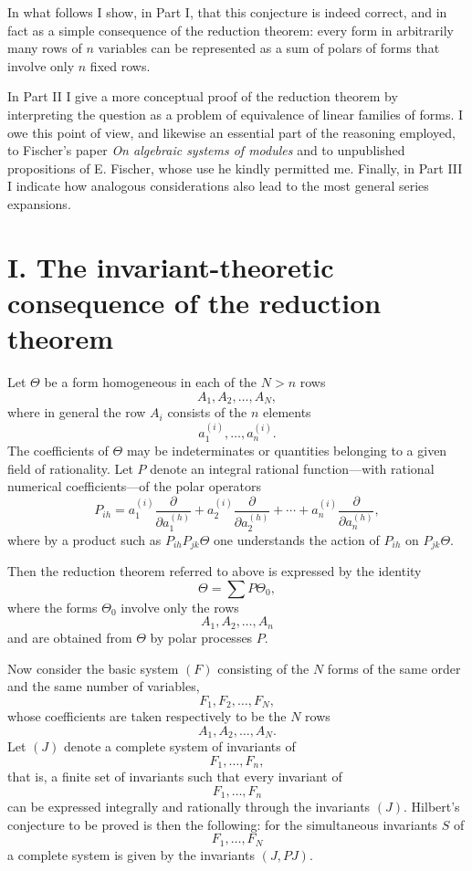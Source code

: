 \documentclass[11pt]{article}
\begin{document}
In what follows I show, in Part I, that this conjecture is indeed correct, and in fact as a simple consequence of the reduction theorem: every form in arbitrarily many rows of \(n\) variables can be represented as a sum of polars of forms that involve only \(n\) fixed rows.

In Part II I give a more conceptual proof of the reduction theorem by interpreting the question as a problem of equivalence of linear families of forms. I owe this point of view, and likewise an essential part of the reasoning employed, to Fischer's paper \emph{On algebraic systems of modules} and to unpublished propositions of E. Fischer, whose use he kindly permitted me. Finally, in Part III I indicate how analogous considerations also lead to the most general series expansions.

\section*{I. The invariant-theoretic consequence of the reduction theorem}

Let \(\Theta\) be a form homogeneous in each of the \(N>n\) rows
\[
A_1,A_2,\dots,A_N,
\]
where in general the row \(A_i\) consists of the \(n\) elements
\[
a_1^{(i)},\dots,a_n^{(i)}.
\]
The coefficients of \(\Theta\) may be indeterminates or quantities belonging to a given field of rationality. Let \(P\) denote an integral rational function---with rational numerical coefficients---of the polar operators
\[
P_{ih}
=
a_1^{(i)}\frac{\partial}{\partial a_1^{(h)}}
+
a_2^{(i)}\frac{\partial}{\partial a_2^{(h)}}
+\cdots+
a_n^{(i)}\frac{\partial}{\partial a_n^{(h)}},
\]
where by a product such as \(P_{ih}P_{jk}\Theta\) one understands the action of \(P_{ih}\) on \(P_{jk}\Theta\).

Then the reduction theorem referred to above is expressed by the identity
\[
\Theta = \sum P\Theta_0,
\tag{1}
\]
where the forms \(\Theta_0\) involve only the rows
\[
A_1,A_2,\dots,A_n
\]
and are obtained from \(\Theta\) by polar processes \(P\).

Now consider the basic system \((F)\) consisting of the \(N\) forms of the same order and the same number of variables,
\[
F_1,F_2,\dots,F_N,
\]
whose coefficients are taken respectively to be the \(N\) rows
\[
A_1,A_2,\dots,A_N.
\]
Let \((J)\) denote a complete system of invariants of
\[
F_1,\dots,F_n,
\]
that is, a finite set of invariants such that every invariant of
\[
F_1,\dots,F_n
\]
can be expressed integrally and rationally through the invariants \((J)\). Hilbert's conjecture to be proved is then the following: for the simultaneous invariants \(S\) of
\[
F_1,\dots,F_N
\]
a complete system is given by the invariants \((J,PJ)\).
\end{document}
